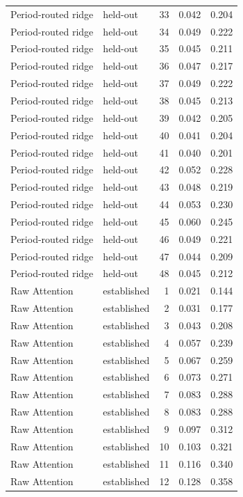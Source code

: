 \begin{tabular}{llrrr}
Period-routed ridge & held-out & 33 & 0.042 & 0.204 \\
Period-routed ridge & held-out & 34 & 0.049 & 0.222 \\
Period-routed ridge & held-out & 35 & 0.045 & 0.211 \\
Period-routed ridge & held-out & 36 & 0.047 & 0.217 \\
Period-routed ridge & held-out & 37 & 0.049 & 0.222 \\
Period-routed ridge & held-out & 38 & 0.045 & 0.213 \\
Period-routed ridge & held-out & 39 & 0.042 & 0.205 \\
Period-routed ridge & held-out & 40 & 0.041 & 0.204 \\
Period-routed ridge & held-out & 41 & 0.040 & 0.201 \\
Period-routed ridge & held-out & 42 & 0.052 & 0.228 \\
Period-routed ridge & held-out & 43 & 0.048 & 0.219 \\
Period-routed ridge & held-out & 44 & 0.053 & 0.230 \\
Period-routed ridge & held-out & 45 & 0.060 & 0.245 \\
Period-routed ridge & held-out & 46 & 0.049 & 0.221 \\
Period-routed ridge & held-out & 47 & 0.044 & 0.209 \\
Period-routed ridge & held-out & 48 & 0.045 & 0.212 \\
Raw Attention & established & 1 & 0.021 & 0.144 \\
Raw Attention & established & 2 & 0.031 & 0.177 \\
Raw Attention & established & 3 & 0.043 & 0.208 \\
Raw Attention & established & 4 & 0.057 & 0.239 \\
Raw Attention & established & 5 & 0.067 & 0.259 \\
Raw Attention & established & 6 & 0.073 & 0.271 \\
Raw Attention & established & 7 & 0.083 & 0.288 \\
Raw Attention & established & 8 & 0.083 & 0.288 \\
Raw Attention & established & 9 & 0.097 & 0.312 \\
Raw Attention & established & 10 & 0.103 & 0.321 \\
Raw Attention & established & 11 & 0.116 & 0.340 \\
Raw Attention & established & 12 & 0.128 & 0.358 \\

\end{tabular}
